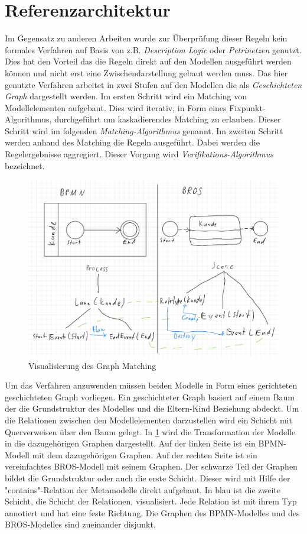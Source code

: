 \section{Referenzarchitektur}

Im Gegensatz zu anderen Arbeiten wurde zur Überprüfung dieser Regeln kein formales Verfahren auf Basis von z.B. \emph{Description Logic} oder \emph{Petrinetzen} genutzt.
Dies hat den Vorteil das die Regeln direkt auf den Modellen ausgeführt werden können und nicht erst eine Zwischendarstellung gebaut werden muss.
Das hier genutzte Verfahren arbeitet in zwei Stufen auf den Modellen die als \emph{Geschichteten Graph} dargestellt werden.
Im ersten Schritt wird ein Matching von Modellelementen aufgebaut. Dies wird iterativ, in Form eines Fixpunkt-Algorithmus, durchgeführt um kaskadierendes Matching zu erlauben.
Dieser Schritt wird im folgenden \emph{Matching-Algorithmus} genannt.
Im zweiten Schritt werden anhand des Matching die Regeln ausgeführt.
Dabei werden die Regelergebnisse aggregiert.
Dieser Vorgang wird \emph{Verifikations-Algorithmus} bezeichnet.

\begin{figure}
    \includegraphics[width=\textwidth,keepaspectratio]{../images/ModelToGraph.pdf}%
    \caption{Visualisierung des Graph Matching}%
    \label{fig:ModelToGraph}
\end{figure}

Um das Verfahren anzuwenden müssen beiden Modelle in Form eines gerichteten geschichteten Graph vorliegen.
Ein geschichteter Graph basiert auf einem Baum der die Grundstruktur des Modelles und die Eltern-Kind Beziehung abdeckt.
Um die Relationen zwischen den Modellelementen darzustellen wird ein Schicht mit Querverweisen über den Baum gelegt.
In \cref{fig:ModelToGraph} wird die Transformation der Modelle in die dazugehörigen Graphen dargestellt.
Auf der linken Seite ist ein BPMN-Modell mit dem dazugehörigen Graphen. 
Auf der rechten Seite ist ein vereinfachtes BROS-Modell mit seinem Graphen.
Der schwarze Teil der Graphen bildet die Grundstruktur oder auch die erste Schicht.
Dieser wird mit Hilfe der "contains"-Relation der Metamodelle direkt aufgebaut.
In blau ist die zweite Schicht, die Schicht der Relationen, visualisiert.
Jede Relation ist mit ihrem Typ annotiert und hat eine feste Richtung.
Die Graphen des BPMN-Modelles und des BROS-Modelles sind zueinander disjunkt.

